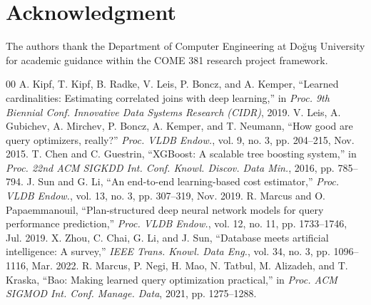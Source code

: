 \documentclass[conference]{IEEEtran}
\begin{document}
\section*{Acknowledgment}
The authors thank the Department of Computer Engineering at Do\u{g}u\c{s} University for academic guidance within the COME 381 research project framework.

\begin{thebibliography}{00}
 A. Kipf, T. Kipf, B. Radke, V. Leis, P. Boncz, and A. Kemper, ``Learned cardinalities: Estimating correlated joins with deep learning,'' in \emph{Proc. 9th Biennial Conf. Innovative Data Systems Research (CIDR)}, 2019.
 V. Leis, A. Gubichev, A. Mirchev, P. Boncz, A. Kemper, and T. Neumann, ``How good are query optimizers, really?'' \emph{Proc. VLDB Endow.}, vol. 9, no. 3, pp. 204--215, Nov. 2015.
 T. Chen and C. Guestrin, ``XGBoost: A scalable tree boosting system,'' in \emph{Proc. 22nd ACM SIGKDD Int. Conf. Knowl. Discov. Data Min.}, 2016, pp. 785--794.
 J. Sun and G. Li, ``An end-to-end learning-based cost estimator,'' \emph{Proc. VLDB Endow.}, vol. 13, no. 3, pp. 307--319, Nov. 2019.
 R. Marcus and O. Papaemmanouil, ``Plan-structured deep neural network models for query performance prediction,'' \emph{Proc. VLDB Endow.}, vol. 12, no. 11, pp. 1733--1746, Jul. 2019.
 X. Zhou, C. Chai, G. Li, and J. Sun, ``Database meets artificial intelligence: A survey,'' \emph{IEEE Trans. Knowl. Data Eng.}, vol. 34, no. 3, pp. 1096--1116, Mar. 2022.
 R. Marcus, P. Negi, H. Mao, N. Tatbul, M. Alizadeh, and T. Kraska, ``Bao: Making learned query optimization practical,'' in \emph{Proc. ACM SIGMOD Int. Conf. Manage. Data}, 2021, pp. 1275--1288.
\end{thebibliography}
\end{document}
